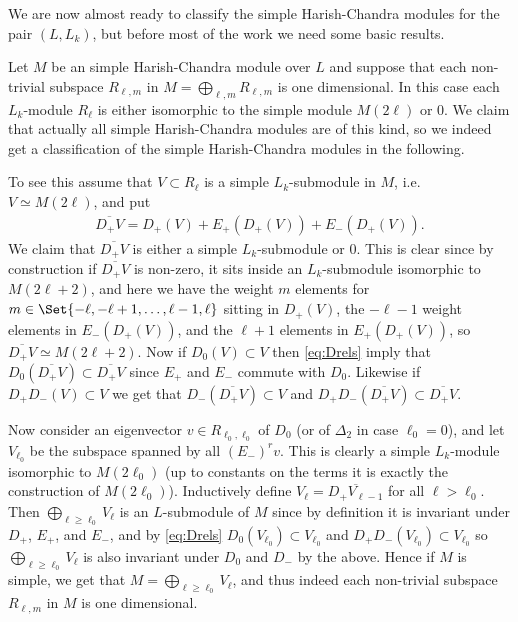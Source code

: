 We are now almost ready to classify the simple Harish-Chandra modules for the pair $(L,L_k)$, but before most of the work we need some basic results.

Let $M$ be an simple Harish-Chandra module over $L$ and suppose that each non-trivial subspace $R_{\ell,m}$ in $M=\bigoplus_{\ell,m} R_{\ell,m}$ is one dimensional. In this case each $L_k$-module $R_\ell$ is either isomorphic to the simple module $M(2\ell)$ or $0$. We claim that actually all simple Harish-Chandra modules are of this kind, so we indeed get a classification of the simple Harish-Chandra modules in the following.

To see this assume that $V\subset R_\ell$ is a simple $L_k$-submodule in $M$, i.e.\ $V\simeq M(2\ell)$, and put
\begin{align*}
  \overline{D_+V} = D_+(V) + E_+(D_+(V)) + E_-(D_+(V)).
\end{align*}
We claim that $\overline{D_+V}$ is either a simple $L_k$-submodule or $0$. This is clear since by construction if $\overline{D_+V}$ is non-zero, it sits inside an $L_k$-submodule isomorphic to $M(2\ell+2)$, and here we have the weight $m$ elements for $m\in\Set{-\ell,-\ell+1,\dotsc,\ell-1,\ell}$ sitting in $D_+(V)$, the $-\ell-1$ weight elements in $E_-(D_+(V))$, and the $\ell+1$ elements in $E_+(D_+(V))$, so $\overline{D_+V}\simeq M(2\ell+2)$. Now if $D_0(V)\subset V$ then \cref{eq:Drels} imply that $D_0(\overline{D_+V})\subset \overline{D_+V}$ since $E_+$ and $E_-$ commute with $D_0$. Likewise if $D_+D_-(V)\subset V$ we get that $D_-(\overline{D_+V})\subset V$ and $D_+D_-(\overline{D_+V}) \subset \overline{D_+V}$.

Now consider an eigenvector $v\in R_{\ell_0,\ell_0}$ of $D_0$ (or of $\Delta_2$ in case $\ell_0=0$), and let $V_{\ell_0}$ be the subspace spanned by all $(E_-)^rv$. This is clearly a simple $L_k$-module isomorphic to $M(2\ell_0)$ (up to constants on the terms it is exactly the construction of $M(2\ell_0)$). Inductively define $V_\ell = \overline{D_+V_{\ell-1}}$ for all $\ell>\ell_0$. Then $\bigoplus_{\ell\geq \ell_0} V_\ell$ is an $L$-submodule of $M$ since by definition it is invariant under $D_+$, $E_+$, and $E_-$, and by \cref{eq:Drels} $D_0(V_{\ell_0})\subset V_{\ell_0}$ and $D_+D_-(V_{\ell_0})\subset V_{\ell_0}$ so $\bigoplus_{\ell\geq \ell_0} V_\ell$ is also invariant under $D_0$ and $D_-$ by the above. Hence if $M$ is simple, we get that $M=\bigoplus_{\ell\geq \ell_0} V_\ell$, and thus indeed each non-trivial subspace $R_{\ell,m}$ in $M$ is one dimensional.

